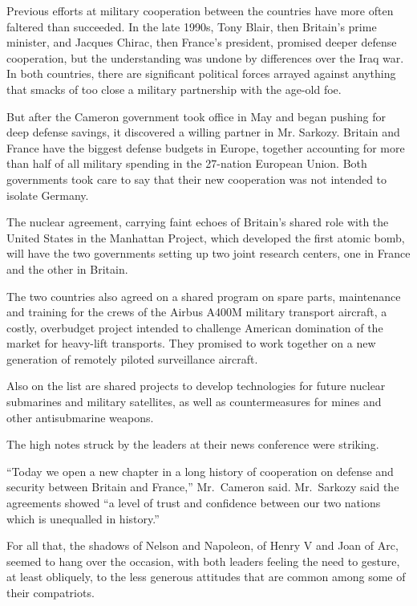 ﻿\documentclass[12pt]{article}
\begin{document}
Previous efforts at military cooperation between the countries have more often faltered than
succeeded. In the late 1990s, Tony Blair, then Britain's prime minister, and Jacques Chirac, then
France's president, promised deeper defense cooperation, but the understanding was undone by
differences over the Iraq war. In both countries, there are significant political forces arrayed
against anything that smacks of too close a military partnership with the age-old foe.

But after the Cameron government took office in May and began pushing for deep defense savings, it
discovered a willing partner in Mr. Sarkozy. Britain and France have the biggest defense budgets in
Europe, together accounting for more than half of all military spending in the 27-nation European
Union. Both governments took care to say that their new cooperation was not intended to isolate
Germany.

The nuclear agreement, carrying faint echoes of Britain's shared role with the United States in the
Manhattan Project, which developed the first atomic bomb, will have the two governments setting up
two joint research centers, one in France and the other in Britain.

The two countries also agreed on a shared program on spare parts, maintenance and training for the
crews of the Airbus A400M military transport aircraft, a costly, overbudget project intended to
challenge American domination of the market for heavy-lift transports. They promised to work
together on a new generation of remotely piloted surveillance aircraft.

Also on the list are shared projects to develop technologies for future nuclear submarines and
military satellites, as well as countermeasures for mines and other antisubmarine weapons.

The high notes struck by the leaders at their news conference were striking.

``Today we open a new chapter in a long history of cooperation on defense and security between
Britain and France,'' Mr.~Cameron said. Mr.~Sarkozy said the agreements showed ``a level of trust
and confidence between our two nations which is unequalled in history.''

For all that, the shadows of Nelson and Napoleon, of Henry V and Joan of Arc, seemed to hang over
the occasion, with both leaders feeling the need to gesture, at least obliquely, to the less
generous attitudes that are common among some of their compatriots.
\end{document}
